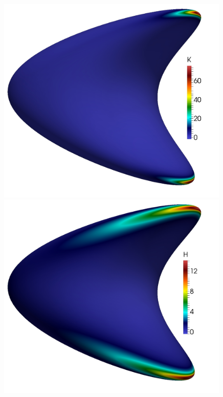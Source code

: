   \begin{figure}
    \begin{minipage}[htp]{.23\textwidth}
      \centering
      \includegraphics[width=0.99\textwidth]{bilder/quartic/K.jpg}
    \end{minipage}\hfill
    \begin{minipage}[htp]{.23\textwidth}
      \centering
      \includegraphics[width=0.99\textwidth]{bilder/quartic/H.jpg}

\end{minipage}
\end{figure}
